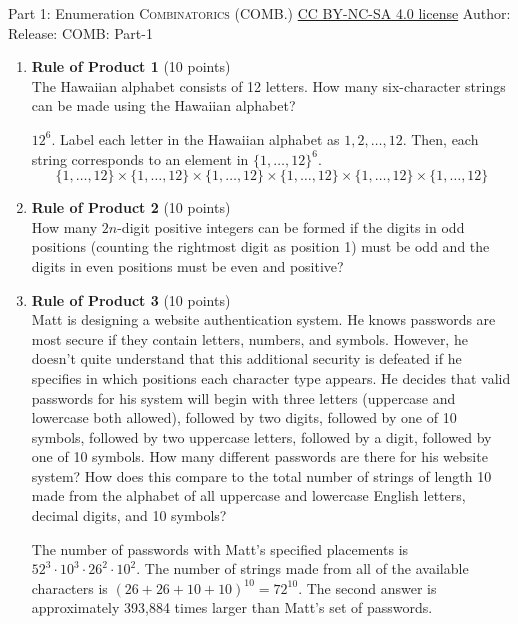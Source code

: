 \newpage\handout
{Part 1: Enumeration}
{\textsc{Combinatorics (COMB.)}}
{\href{https://creativecommons.org/licenses/by-nc-sa/4.0/}{CC BY-NC-SA 4.0 license}}
{Author: \BookAuthor}{Release: \generatedOn}
{COMB: Part-1}

\newpage

\begin{enumerate}
  \item \textbf{Rule of Product 1} (10 points)\\
  The Hawaiian alphabet consists of 12 letters. How many six-character strings can be made using the Hawaiian alphabet?
  \begin{subanswer}
    $12^6$. Label each letter in the Hawaiian alphabet as $1,2,\ldots,12$. Then, each string corresponds to an element in $\{1,\ldots,12\}^6$.
    $$
    \{1, \ldots, 12\} \times\{1, \ldots, 12\} \times\{1, \ldots, 12\} \times\{1, \ldots, 12\} \times\{1, \ldots, 12\} \times\{1, \ldots, 12\}
    $$
  \end{subanswer}

  \item \textbf{Rule of Product 2} (10 points)\\
  How many $2n$-digit positive integers can be formed if the digits in odd positions (counting the rightmost digit as position 1) must be odd and the digits in even positions must be even and positive?
  \begin{subanswer}
  \end{subanswer}

  \item \textbf{Rule of Product 3} (10 points)\\
  Matt is designing a website authentication system. He knows passwords are most secure if they contain letters, numbers, and symbols. However, he doesn't quite understand that this additional security is defeated if he specifies in which positions each character type appears. He decides that valid passwords for his system will begin with three letters (uppercase and lowercase both allowed), followed by two digits, followed by one of 10 symbols, followed by two uppercase letters, followed by a digit, followed by one of 10 symbols. How many different passwords are there for his website system? How does this compare to the total number of strings of length 10 made from the alphabet of all uppercase and lowercase English letters, decimal digits, and 10 symbols?
  \begin{subanswer}
    The number of passwords with Matt's specified placements is $52^3 \cdot 10^3 \cdot 26^2 \cdot 10^2$. The number of strings made from all of the available characters is $(26+26+10+10)^{10} = 72^{10}$. The second answer is approximately 393,884 times larger than Matt's set of passwords.
  \end{subanswer}


\end{enumerate}
